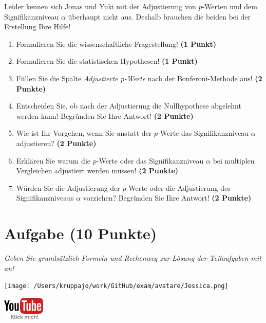 \documentclass[a4paper, 9pt]{scrartcl}\usepackage[]{graphicx}\usepackage[]{xcolor}
\begin{document}
Leider kennen sich Jonas und Yuki mit der Adjustierung von $p$-Werten und dem Signifikanzniveau $\alpha$ überhaupt nicht aus. Deshalb brauchen die beiden bei der Erstellung Ihre Hilfe!

\begin{enumerate}
  \item Formulieren Sie die wissenschaftliche Fragestellung! \textbf{(1 Punkt)}
  \item Formulieren Sie die statistischen Hypothesen! \textbf{(1 Punkt)}
\item Füllen Sie die Spalte \textit{Adjustierte p-Werte} nach der Bonferoni-Methode aus! \textbf{(2 Punkte)}
\item Entscheiden Sie, ob nach der Adjustierung die Nullhypothese abgelehnt werden kann! Begründen Sie Ihre Antwort! \textbf{(2 Punkte)}
\item Wie ist Ihr Vorgehen, wenn Sie anstatt der $p$-Werte das Signifikanzniveau $\alpha$ adjustieren? \textbf{(2 Punkte)}
\item Erklären Sie warum die $p$-Werte oder das Signifikanzniveau $\alpha$ bei multiplen Vergleichen adjustiert werden müssen! \textbf{(2 Punkte)}
\item Würden Sie die Adjustierung der $p$-Werte oder die Adjustierung des Signifikanzniveaus $\alpha$ vorziehen? Begründen Sie Ihre Antwort! \textbf{(2 Punkte)}
\end{enumerate}


 
\clearpage

\section{Aufgabe \hfill (10 Punkte)}

\textit{Geben Sie grundsätzlich Formeln und Rechenweg zur Lösung der Teilaufgaben mit an!} \\[1Ex]
 

 
\begin{minipage}[t]{0.5\textwidth}
\texttt{[image: /Users/kruppajo/work/GitHub/exam/avatare/Jessica.png]}
\end{minipage}
\begin{minipage}[t]{0.5\textwidth}
\hfill
\href{https://youtu.be/xq29O8qDrg0}{\includegraphics[width = 2cm]{img/youtube}}
\end{minipage}
\vspace{-3ex}
\end{document}

